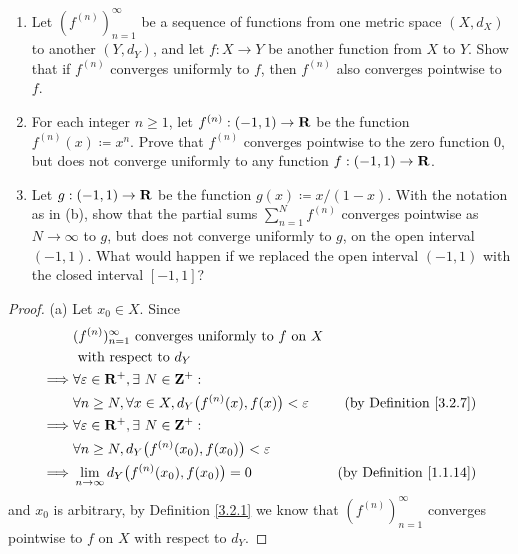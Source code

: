 \begin{exercise}\label{ex 3.2.2}
    \quad
    \begin{enumerate}
        \item Let \((f^{(n)})_{n = 1}^\infty\) be a sequence of functions from one metric space \((X, d_X)\) to another \((Y, d_Y)\), and let \(f : X \to Y\) be another function from \(X\) to \(Y\).
              Show that if \(f^{(n)}\) converges uniformly to \(f\), then \(f^{(n)}\) also converges pointwise to \(f\).
        \item For each integer \(n \geq 1\), let \(f^{(n)} : (-1, 1) \to \mathbf{R}\) be the function \(f^{(n)}(x) \coloneqq x^n\).
              Prove that \(f^{(n)}\) converges pointwise to the zero function \(0\), but does not converge uniformly to any function \(f : (-1, 1) \to \mathbf{R}\).
        \item Let \(g : (-1, 1) \to \mathbf{R}\) be the function \(g(x) \coloneqq x / (1 - x)\).
              With the notation as in (b), show that the partial sums \(\sum_{n = 1}^N f^{(n)}\) converges pointwise as \(N \to \infty\) to \(g\), but does not converge uniformly to \(g\), on the open interval \((-1, 1)\).
              What would happen if we replaced the open interval \((-1, 1)\) with the closed interval \([-1, 1]\)?
    \end{enumerate}
\end{exercise}

\begin{proof}{(a)}
    Let \(x_0 \in X\).
    Since
    \begin{align*}
                 & (f^{(n)})_{n = 1}^\infty \text{ converges uniformly to } f \text{ on } X                                             \\
                 & \text{ with respect to } d_Y                                                                                         \\
        \implies & \forall \varepsilon \in \mathbf{R}^+, \exists\ N \in \mathbf{Z}^+ :                                                                  \\
                 & \forall n \geq N, \forall x \in X, d_Y\big(f^{(n)}(x), f(x)\big) < \varepsilon & \text{(by Definition \ref{3.2.7})}  \\
        \implies & \forall \varepsilon \in \mathbf{R}^+, \exists\ N \in \mathbf{Z}^+ :                                                                  \\
                 & \forall n \geq N, d_Y\big(f^{(n)}(x_0), f(x_0)\big) < \varepsilon                                                    \\
        \implies & \lim_{n \to \infty} d_Y\big(f^{(n)}(x_0), f(x_0)\big) = 0                      & \text{(by Definition \ref{1.1.14})}
    \end{align*}
    and \(x_0\) is arbitrary, by Definition \ref{3.2.1} we know that \((f^{(n)})_{n = 1}^\infty\) converges pointwise to \(f\) on \(X\) with respect to \(d_Y\).
\end{proof}

